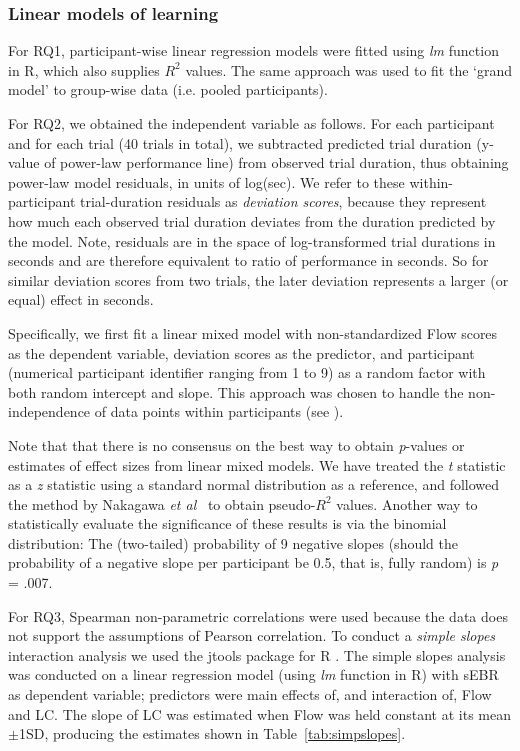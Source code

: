 \documentclass[fleqn,10pt]{wlscirep}
\begin{document}
\subsubsection*{Linear models of learning}
For {\sf RQ1}, participant-wise linear regression models were fitted using {\it lm} function in {\sf R}, which also supplies $R^2$ values. The same approach was used to fit the `grand model' to group-wise data (i.e. pooled participants).

For {\sf RQ2}, we obtained the independent variable as follows. For each participant and for each trial (40 trials in total), we subtracted predicted trial duration (y-value of power-law performance line) from observed trial duration, thus obtaining power-law model residuals, in units of log(sec). We refer to these within-participant trial-duration residuals as {\it deviation scores}, because they represent how much each observed trial duration deviates from the duration predicted by the model. Note, residuals are in the space of log-transformed trial durations in seconds and are therefore equivalent to ratio of performance in seconds. So for similar deviation scores from two trials, the later deviation represents a larger (or equal) effect in seconds.

Specifically, we first fit a linear mixed model with non-standardized Flow scores as the dependent variable, deviation scores as the predictor, and participant (numerical participant identifier ranging from 1 to 9) as a random factor with both random intercept and slope. This approach was chosen to handle the non-independence of data points within participants (see \cite{Bates2015_lme4}).

Note that that there is no consensus on the best way to obtain {\it p}-values or estimates of effect sizes from linear mixed models. We have treated the {\it t} statistic as a {\it z} statistic using a standard normal distribution as a reference, and followed the method by Nakagawa {\it et al}~\cite{nakagawa2013general} to obtain pseudo-$R^2$ values. Another way to statistically evaluate the significance of these results is via the binomial distribution: The (two-tailed) probability of 9 negative slopes (should the probability of a negative slope per participant be 0.5, that is, fully random) is {\it p} = .007.

For {\sf RQ3}, Spearman non-parametric correlations were used because the data does not support the assumptions of Pearson correlation. To conduct a {\it simple slopes} interaction analysis we used the {\sf jtools} package for {\sf R} \cite{jtools}. The simple slopes analysis was conducted on a linear regression model (using {\it lm} function in {\sf R}) with sEBR as dependent variable; predictors were main effects of, and interaction of, Flow and LC. The slope of LC was estimated when Flow was held constant at its mean$\pm$1SD, producing the estimates shown in Table~\ref{tab:simpslopes}.
\end{document}
